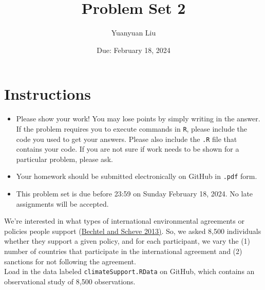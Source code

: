 \documentclass[12pt,letterpaper]{article}
\title{Problem Set 2}
\date{Due: February 18, 2024}
\author{Yuanyuan Liu}
\begin{document}
	\maketitle
	\section*{Instructions}
	\begin{itemize}
		\item Please show your work! You may lose points by simply writing in the answer. If the problem requires you to execute commands in \texttt{R}, please include the code you used to get your answers. Please also include the \texttt{.R} file that contains your code. If you are not sure if work needs to be shown for a particular problem, please ask.
		\item Your homework should be submitted electronically on GitHub in \texttt{.pdf} form.
		\item This problem set is due before 23:59 on Sunday February 18, 2024. No late assignments will be accepted.
	\end{itemize}

	
	

	\vspace{.25cm}
\noindent We're interested in what types of international environmental agreements or policies people support (\href{https://www.pnas.org/content/110/34/13763}{Bechtel and Scheve 2013)}. So, we asked 8,500 individuals whether they support a given policy, and for each participant, we vary the (1) number of countries that participate in the international agreement and (2) sanctions for not following the agreement. \\

\noindent Load in the data labeled \texttt{climateSupport.RData} on GitHub, which contains an observational study of 8,500 observations.
\end{document}
